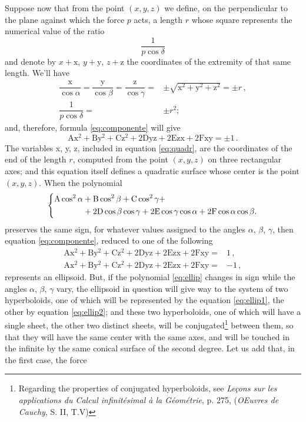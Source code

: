 \documentclass[leqno,openright,smallroyalvopaper,8pt,twoside,showtrims]{memoir}
\begin{document}
Suppose now that from the point $(x, y, z)$ we define, on the perpendicular to the plane against which the force $p$ acts, a length $r$ whose square represents the numerical value of the ratio
\begin{equation}
\dfrac{1}{p\cos\delta}
\end{equation}
and denote by $x + \text{x}$, $y + \text{y}$, $z + \text{z}$ the coordinates of the extremity of that same length. We'll have
\begin{align}
\dfrac{\text{x}}{\cos\alpha}=\dfrac{\text{y}}{\cos\beta}=\dfrac{\text{z}}{\cos\gamma}=&\pm\sqrt{\text{x}^2+\text{y}^2+\text{z}^2}=\pm r\,,\\
\dfrac{1}{p\cos\delta}=&\pm r^2;
\end{align}
and, therefore, formula \eqref{eq:componente} will give
\begin{equation}\label{eq:quadr}
\text{A}\text{x}^2+\text{B}\text{y}^2+\text{C}\text{z}^2+2\text{Dyz}+2\text{Ezx}+2\text{Fxy} = \pm 1\,.
\end{equation}
The variables x, y, z, included in equation \eqref{eq:quadr}, are the coordinates of the end of the length $r$, computed from the point $(x, y, z)$ on three rectangular axes; and this equation itself defines a quadratic surface whose center is the point $(x, y, z)$. When the polynomial
\begin{equation}\label{eq:ellip}
\begin{dcases}
\begin{aligned}
\text{A}\cos^2\alpha &+\text{B}\cos^2\beta+\text{C}\cos^2\gamma+\\
&+2\text{D}\cos\beta\cos\gamma +2\text{E}\cos\gamma\cos\alpha+2\text{F}\cos\alpha\cos\beta.
\end{aligned}
\end{dcases}
\end{equation}
preserves the same sign, for whatever values assigned to the angles $\alpha$, $\beta$, $\gamma$, then equation \eqref{eq:componente}, reduced to one of the following
\begin{align}
\text{A}\text{x}^2+\text{B}\text{y}^2+\text{C}\text{z}^2+2\text{Dyz}+2\text{Ezx}+2\text{Fxy} =& 1\,,\label{eq:ellip1}\\
\text{A}\text{x}^2+\text{B}\text{y}^2+\text{C}\text{z}^2+2\text{Dyz}+2\text{Ezx}+2\text{Fxy} =& -1\,,\label{eq:ellip2}
\end{align}
represents an ellipsoid. But, if the polynomial \eqref{eq:ellip} changes in sign while the angles $\alpha$, $\beta$, $\gamma$ vary, the ellipsoid in question will give way to the system of two hyperboloids, one of which will be represented by the equation \eqref{eq:ellip1}, the other by equation \eqref{eq:ellip2}; and these two hyperboloids, one of which will have a single sheet, the other two distinct sheets, will be conjugated\footnote{Regarding the properties of conjugated hyperboloids, see \emph{Le\c{c}ons sur les applications du Calcul infinit\'esimal \`a la G\'eom\'etrie}, p. 275, (\emph{OEuvres de Cauchy}, S. II, T.V)} between them, so that they will have the same center with the same axes, and will be touched in the infinite by the same conical surface of the second degree. Let us add that, in the first case, the force
\end{document}
